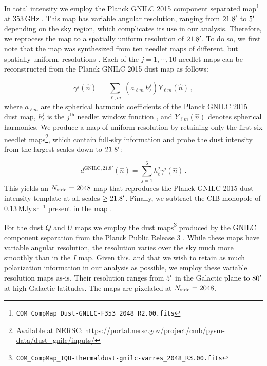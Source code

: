 \documentclass[twocolumn]{aastex631}
\begin{document}
In total intensity we employ the Planck GNILC 2015 component separated map\footnote{\texttt{COM\_CompMap\_Dust-GNILC-F353\_2048\_R2.00.fits}} at $353$\,GHz \citep{planck2016-XLVIII}. This map has variable angular resolution, ranging from $21.8\mbox{$^\prime$}$ to $5\mbox{$^\prime$}$ depending on the sky region, which complicates its use in our analysis. Therefore, we reprocess the map to a spatially uniform resolution of $21.8\mbox{$^\prime$}$. To do so, we first note that the map was synthesized from ten needlet maps of different, but spatially uniform, resolutions \citep[][Figure~A.2]{planck2016-XLVIII}. Each of the $j=1,\cdots,10$ needlet maps can be reconstructed from the Planck GNILC 2015 dust map as follows:

\begin{equation}
\gamma^{j}(\hat{n})
=\sum_{\substack{\ell,m}} \left(a_{\ell m}\, h^{j}_\ell\right)Y_{\ell m}(\hat{n})\,,
\label{eq:needlets_maps}
\end{equation}
where $a_{\ell m}$ are the spherical harmonic coefficients of the Planck GNILC 2015 dust map,  $h^{j}_\ell$ is the $j^\text{th}$ needlet window function \citep[see][Figure~A.2]{planck2016-XLVIII}, and $Y_{\ell m}(\hat{n})$ denotes spherical harmonics. We produce a map of uniform resolution by retaining only the first six needlet maps\footnote{Available at NERSC: \url{https://portal.nersc.gov/project/cmb/pysm-data/dust_gnilc/inputs/}}, which contain full-sky information and probe the dust intensity from the largest scales down to $21.8\mbox{$^\prime$}$:

 \begin{equation}
 d^{\text{GNILC,}\, 21.8'}(\hat{n})
=\sum_{j=1}^6 h^{j}_\ell \gamma^{j}(\hat{n})\,.
\label{eq:trucated_synthesis}
\end{equation}
This yields an $N_{\rm side} = 2048$ map that reproduces the Planck GNILC 2015 dust intensity template at all scales $\geq 21.8\mbox{$^\prime$}$. Finally, we subtract the CIB monopole of $0.13\, \text{MJy}\,\text{sr}^{-1}$ present in the map \citep[][Section~2.2]{planck2016-l11B}.

For the dust $Q$ and $U$ maps we employ the dust maps\footnote{\texttt{COM\_CompMap\_IQU-thermaldust-gnilc-varres\_2048\_R3.00.fits}} produced by the GNILC component separation from the Planck Public Release 3 \citep{planck2016-l04,planck2016-l11B}. While these maps have variable angular resolution, the resolution varies over the sky much more smoothly than in the $I$ map. Given this, and that we wish to retain as much polarization information in our analysis as possible, we employ these variable resolution maps as-is. Their resolution ranges from $5\mbox{$^\prime$}$ in the Galactic plane to $80\mbox{$^\prime$}$ at high Galactic latitudes. The maps are pixelated at $N_{\rm side} = 2048$. 
\end{document}
